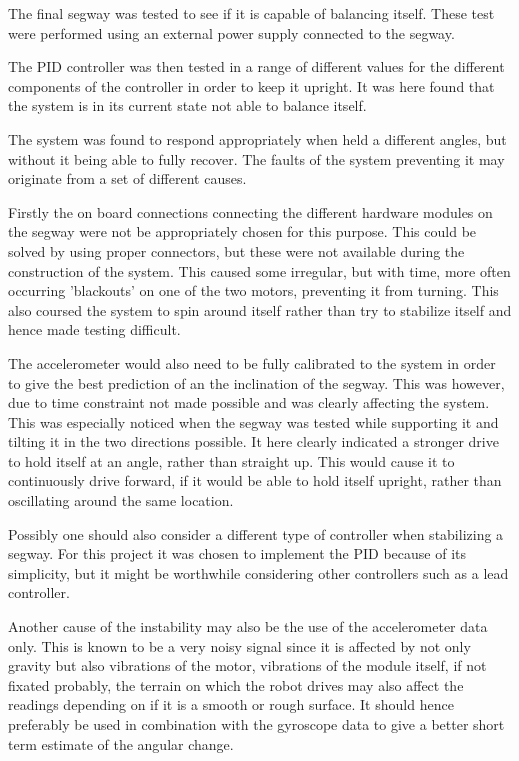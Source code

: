 The final segway was tested to see if it is capable of balancing itself.
These test were performed using an external power supply connected to the segway.

The PID controller was then tested in a range of different values for the different components of the controller in order to keep it upright.
It was here found that the system is in its current state not able to balance itself.

The system was found to respond appropriately when held a different angles, but without it being able to fully recover.
The faults of the system preventing it may originate from a set of different causes.

Firstly the on board connections connecting the different hardware modules on the segway were not be appropriately chosen for this purpose.
This could be solved by using proper connectors, but these were not available during the construction of the system.
This caused some irregular, but with time, more often occurring 'blackouts' on one of the two motors, preventing it from turning.
This also coursed the system to spin around itself rather than try to stabilize itself and hence made testing difficult.

The accelerometer would also need to be fully calibrated to the system in order to give the best prediction of an the inclination of the segway.
This was however, due to time constraint not made possible and was clearly affecting the system.
This was especially noticed when the segway was tested while supporting it and tilting it in the two directions possible.
It here clearly indicated a stronger drive to hold itself at an angle, rather than straight up.
This would cause it to continuously drive forward, if it would be able to hold itself upright, rather than oscillating around the same location.

Possibly one should also consider a different type of controller when stabilizing a segway.
For this project it was chosen to implement the PID because of its simplicity, but it might be worthwhile considering other controllers such as a lead controller.

Another cause of the instability may also be the use of the accelerometer data only.
This is known to be a very noisy signal since it is affected by not only gravity but also vibrations of the motor, vibrations of the module itself, if not fixated probably, the terrain on which the robot drives may also affect the readings depending on if it is a smooth or rough surface.
It should hence preferably be used in combination with the gyroscope data to give a better short term estimate of the angular change.